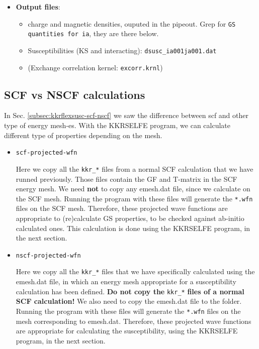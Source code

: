 \documentclass[a4paper,10pt,fullpage]{report}
\begin{document}
\begin{itemize}
\begin{itemize}
\end{itemize}


\item \textbf{Output files}:

\begin{itemize}

 \item charge and magnetic densities, ouputed in the pipeout. Grep for
 \verb|GS quantities for ia|, they are there below.  

 \item Susceptibilities (KS and interacting): \verb|dsusc_ia001ja001.dat|
 
 \item (Exchange correlation kernel: \verb|excorr.krnl|)
 
 
\end{itemize}

\end{itemize}



\subsection{SCF vs NSCF calculations}
\label{subsec:kkrselfe-scf-nscf}

In Sec. \ref{subsec:kkrflexsusc-scf-nscf} we saw the difference between scf and
other type of energy mesh-es. With the KKRSELFE program, we can calculate 
different type of properties depending on the mesh. 

\begin{itemize}

\item \verb|scf-projected-wfn| 

Here we copy all the \verb|kkr_*| files from a normal SCF calculation 
that we have runned previously. Those files contain the GF and T-matrix
in the SCF energy mesh. We need \textbf{not} to copy any emesh.dat file,
since we calculate on the SCF mesh. Running the program with these files 
will generate the \verb|*.wfn|
files on the SCF mesh. Therefore, these projected wave functions are appropriate
to (re)calculate GS properties, to be checked against ab-initio calculated ones.
This calculation is done using the KKRSELFE program, in the next section.

\item \verb|nscf-projected-wfn| 

Here we copy all the \verb|kkr_*| files that we have specifically 
calculated using the emesh.dat file, in which an energy mesh appropriate
for a susceptibility calculation has been defined. 
\textbf{Do not copy the} \verb|kkr_*| \textbf{files of a normal SCF calculation!}
We also need to copy the
emesh.dat file to the folder. Running the program with these files
will generate the \verb|*.wfn|
files on the mesh corresponding to emesh.dat. Therefore, these projected wave 
functions are appropriate for calculating the susceptibility, 
using the KKRSELFE program, in the next section.

\end{itemize}
\end{document}
